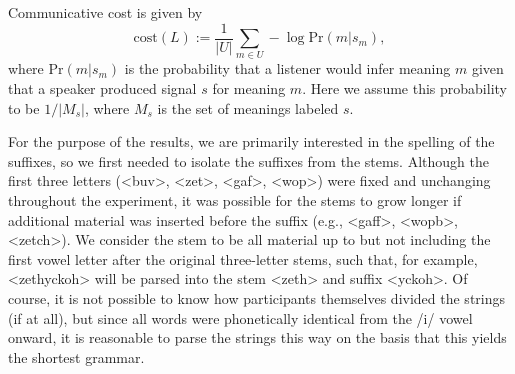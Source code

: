 \documentclass[doc,biblatex]{apa7}
\begin{document}
Communicative cost is given by
\begin{equation}
\mathrm{cost}(L) := \frac{1}{|U|} \sum_{m \in U} -\log \mathrm{Pr}(m|s_m),
\end{equation}
where $\mathrm{Pr}(m|s_m)$ is the probability that a listener would infer meaning $m$ given that a speaker produced signal $s$ for meaning $m$. Here we assume this probability to be $1/|M_s|$, where $M_s$ is the set of meanings labeled $s$.


For the purpose of the results, we are primarily interested in the spelling of the suffixes, so we first needed to isolate the suffixes from the stems. Although the first three letters (<buv>, <zet>, <gaf>, <wop>) were fixed and unchanging throughout the experiment, it was possible for the stems to grow longer if additional material was inserted before the suffix (e.g., <gaff>, <wopb>, <zetch>). We consider the stem to be all material up to but not including the first vowel letter after the original three-letter stems, such that, for example, <zethyckoh> will be parsed into the stem <zeth> and suffix <yckoh>. Of course, it is not possible to know how participants themselves divided the strings (if at all), but since all words were phonetically identical from the /i/ vowel onward, it is reasonable to parse the strings this way on the basis that this yields the shortest grammar.
\end{document}
